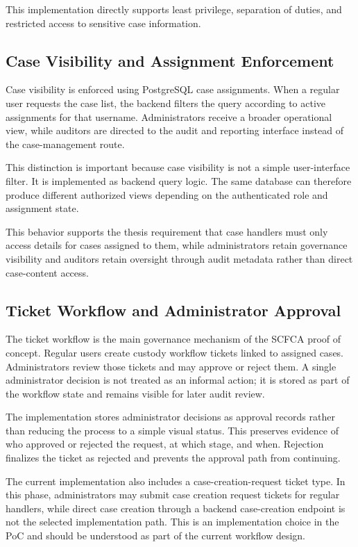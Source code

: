 \documentclass[12pt,a4paper]{report}
\begin{document}
This implementation directly supports least privilege, separation of duties, and restricted access to sensitive case information.

\subsection{Case Visibility and Assignment Enforcement}

Case visibility is enforced using PostgreSQL case assignments. When a regular user requests the case list, the backend filters the query according to active assignments for that username. Administrators receive a broader operational view, while auditors are directed to the audit and reporting interface instead of the case-management route.

This distinction is important because case visibility is not a simple user-interface filter. It is implemented as backend query logic. The same database can therefore produce different authorized views depending on the authenticated role and assignment state.

This behavior supports the thesis requirement that case handlers must only access details for cases assigned to them, while administrators retain governance visibility and auditors retain oversight through audit metadata rather than direct case-content access.

\subsection{Ticket Workflow and Administrator Approval}

The ticket workflow is the main governance mechanism of the SCFCA proof of concept. Regular users create custody workflow tickets linked to assigned cases. Administrators review those tickets and may approve or reject them. A single administrator decision is not treated as an informal action; it is stored as part of the workflow state and remains visible for later audit review.

The implementation stores administrator decisions as approval records rather than reducing the process to a simple visual status. This preserves evidence of who approved or rejected the request, at which stage, and when. Rejection finalizes the ticket as rejected and prevents the approval path from continuing.

The current implementation also includes a case-creation-request ticket type. In this phase, administrators may submit case creation request tickets for regular handlers, while direct case creation through a backend case-creation endpoint is not the selected implementation path. This is an implementation choice in the PoC and should be understood as part of the current workflow design.
\end{document}
